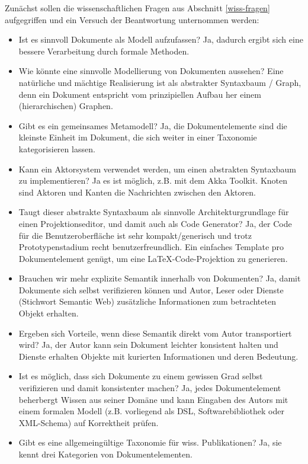 Zunächst sollen die wissenschaftlichen Fragen aus Abschnitt \ref{wiss-fragen} aufgegriffen und  ein Versuch der Beantwortung unternommen werden:

 
\begin{itemize}

\item Ist es sinnvoll Dokumente als Modell aufzufassen? Ja, dadurch ergibt sich eine bessere Verarbeitung durch formale Methoden.
\item Wie könnte eine sinnvolle Modellierung von Dokumenten aussehen? Eine natürliche und mächtige Realisierung ist als abstrakter Syntaxbaum / Graph, denn ein Dokument entspricht vom prinzipiellen Aufbau her einem (hierarchischen) Graphen.
\item Gibt es ein gemeinsames Metamodell? Ja, die Dokumentelemente sind die kleinste Einheit im Dokument, die sich weiter in einer Taxonomie kategorisieren lassen.
\item Kann ein Aktorsystem verwendet werden, um einen abstrakten Syntaxbaum zu implementieren? Ja es ist möglich, z.B. mit dem Akka Toolkit. Knoten sind Aktoren und Kanten die Nachrichten zwischen den Aktoren.
\item Taugt dieser abstrakte Syntaxbaum als sinnvolle Architekturgrundlage für einen Projektionseditor, und damit auch als Code Generator? Ja, der Code für die Benutzeroberfläche ist sehr kompakt/generisch und trotz Prototypenstadium recht benutzerfreundlich. Ein einfaches Template pro Dokumentelement genügt, um eine LaTeX-Code-Projektion zu generieren.
\item Brauchen wir mehr explizite Semantik innerhalb von Dokumenten? Ja, damit Dokumente sich selbst verifizieren können und Autor, Leser oder Dienste (Stichwort Semantic Web) zusätzliche Informationen zum betrachteten Objekt erhalten.
\item Ergeben sich Vorteile, wenn diese Semantik direkt vom Autor transportiert wird? Ja, der Autor kann sein Dokument leichter konsistent halten und Dienste erhalten Objekte mit kurierten Informationen und deren Bedeutung.
\item Ist es möglich, dass sich Dokumente zu einem gewissen Grad selbst verifizieren und damit konsistenter machen? Ja, jedes Dokumentelement beherbergt Wissen aus seiner Domäne und kann Eingaben des Autors mit einem formalen Modell (z.B. vorliegend als DSL, Softwarebibliothek oder XML-Schema) auf Korrektheit prüfen.
\item Gibt es eine allgemeingültige Taxonomie für wiss. Publikationen? Ja, sie kennt drei Kategorien von Dokumentelementen.
\end{itemize}
 
